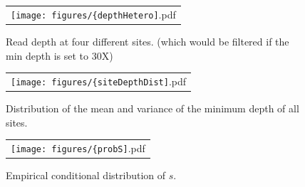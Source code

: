 \documentclass[11pt]{article}
\begin{document}
\begin{figure}[H]
	\centering
	\begin{tabular}{c}
		\texttt{[image: figures/\{depthHetero]}.pdf}
	\end{tabular}
	\caption{Read depth at four different sites. (which would be filtered if the min depth is set to 30X)} 
	\label{fig:depthHetero}
\end{figure}

\begin{figure}[H]
	\centering
	\begin{tabular}{c}
		\texttt{[image: figures/\{siteDepthDist]}.pdf}\\
	\end{tabular}
	\caption{Distribution of the mean and variance of the minimum depth of all sites.} 
	\label{fig:siteDepthDist}
\end{figure}
\begin{figure}[H]
	\centering
	\begin{tabular}{c}
		\texttt{[image: figures/\{probS]}.pdf}\\
	\end{tabular}
	\caption{Empirical conditional distribution of $s$.} 
	\label{fig:probS}
\end{figure}
\newpage


\end{document}
